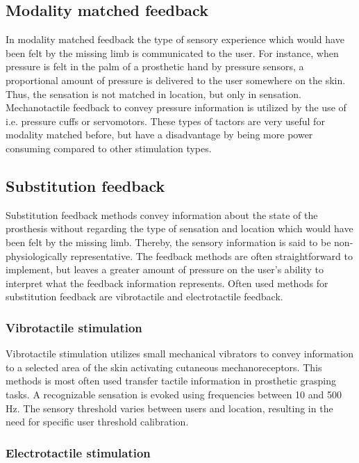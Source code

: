 \subsection{Modality matched feedback}

In modality matched feedback the type of sensory experience which would have been felt by the missing limb is communicated to the user. For instance, when pressure is felt in the palm of a prosthetic hand by pressure sensors, a proportional amount of pressure is delivered to the user somewhere on the skin. Thus, the sensation is not matched in location, but only in sensation. Mechanotactile feedback to convey pressure information is utilized by the use of i.e. pressure cuffs or servomotors. These types of tactors are very useful for modality matched before, but have a disadvantage by being more power consuming compared to other stimulation types. \cite{Schofield2014,Antfolk2018} 

\subsection{Substitution feedback}

Substitution feedback methods convey information about the state of the prosthesis without regarding the type of sensation and location which would have been felt by the missing limb. Thereby, the sensory information is said to be non-physiologically representative. The feedback methods are often straightforward to implement, but leaves a greater amount of pressure on the user's ability to interpret what the feedback information represents. Often used methods for substitution feedback are vibrotactile and electrotactile feedback. \cite{Schofield2014,Antfolk2018}     

\subsubsection{Vibrotactile stimulation}

Vibrotactile stimulation utilizes small mechanical vibrators to convey information to a selected area of the skin activating cutaneous mechanoreceptors. This methods is most often used transfer tactile information in prosthetic grasping tasks. \cite{Schofield2014} A recognizable sensation is evoked using frequencies between 10 and 500 Hz. The sensory threshold varies between users and location, resulting in the need for specific user threshold calibration. \cite{Antfolk2018}  


\subsubsection{Electrotactile stimulation} \label{E-stim}

